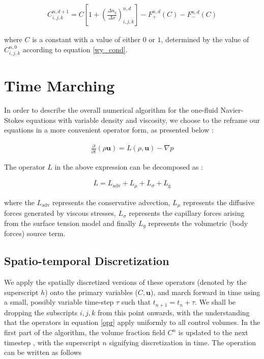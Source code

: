\begin{align}
C_{i,j,k}^{n,d+1} =  C \left[1 + \left(\frac{\Delta u_q}{\Delta x}\right)^{n,d}_{i,j,k} \right] - F_{+}^{n,d}\left(C \right) - F_{-}^{n,d}\left(C \right)   
\label{wy_discrete}
\end{align}

where $C$ is a constant with a value of either $0$ or $1$, determined by the value of $C_{i,j,k}^{n,0}$ according to equation \ref{wy_cond}.  


\section{Time Marching}

In order to describe the overall numerical algorithm for the one-fluid Navier-Stokes equations with variable density and viscosity, we choose to the reframe our equations in a more convenient operator form, as presented below : 

\begin{align}
   \frac{\partial}{\partial t} \left( \rho \boldsymbol{u} \right) = L\left( \rho,\boldsymbol{u} \right) - \nabla p
\end{align}

The operator $L$ in the above expression can be decomposed as : 

\begin{align}
	L = L_{\textrm{adv}} + L_{\mu} + L_{\sigma} + L_{\textrm{g}} 
   \label{opr}
\end{align}

where the $L_{\textrm{adv}}$ represents the conservative advection, 
$L_{\mu}$ represents the diffusive forces generated by viscous stresses,
$L_{\sigma}$ represents the capillary forces arising from the surface tension model
and finally $L_{g}$ represents the volumetric (body forces) source term. 

\subsection*{Spatio-temporal Discretization}

We apply the spatially discretized versions of these operators (denoted by the superscript $h$) 
onto the primary variables ($C,\boldsymbol{u}$), and march forward in time using a small, 
possibly variable time-step $\tau$ such that $t_{n+1} = t_{n} + \tau$. 
We shall be dropping the subscripts $i,j,k$ from this point onwards, with the understanding 
that the operators in equation \ref{opr} apply uniformly to all control volumes. 
In the first part of the algorithm, the volume fraction field $C^{n}$ is updated to the next timestep 
, with the superscript $n$ signifying discretization in time. The operation can be written as follows        

